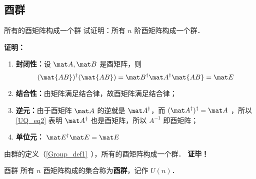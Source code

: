 \subsection{酉群}
\begin{example}{所有的酉矩阵构成一个群}
试证明：所有 $n$ 阶酉矩阵构成一个群．

\textbf{证明：}
\begin{enumerate}
\item \textbf{封闭性：}设 $\mat A,\mat B$ 是酉矩阵，则
\begin{equation}
(\mat{AB})^\dagger(\mat{AB})=\mat B^\dagger \mat A^\dagger\mat{AB}=\mat E
\end{equation}
\item \textbf{结合性：}由矩阵满足结合律，故酉矩阵满足结合律；
\item \textbf{逆元：}由于酉矩阵 $\mat A$ 的逆就是 $\mat A^\dagger$，而 $(\mat A^\dagger)^\dagger=\mat A$ ，所以\autoref{UQ_eq2} 表明 $\mat A^\dagger$ 也是酉矩阵，所以 $A^{-1}$ 即酉矩阵；
\item \textbf{单位元：} $\mat E^\dagger\mat E=\mat E$
\end{enumerate}
由群的定义（\autoref{Group_def1}~），所有的酉矩阵构成一个群．
\textbf{证毕！}
\end{example}
\begin{definition}{酉群}
所有 $n$ 酉矩阵构成的集合称为\textbf{酉群}，记作 $U(n)$．
\end{definition}